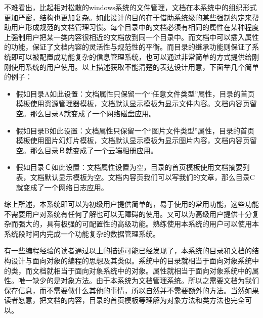 不难看出，比起相对松散的windows系统的文件管理，文档在本系统中的组织形式更加严密，结构也更加复杂。如此设计的目的在于借助系统级的某些强制约定来帮助用户形成规范的文档管理习惯。每个目录中的文档必须有相同的属性在某种程度上强制用户把某一类内容很相近的文档放到同一个目录中。而文档中可以插入属性的功能，保证了文档内容的灵活性与规范性的平衡。而目录的继承功能则保证了系统即可以被配置成功能复杂的信息管理系统，也可以通过非常简单的方式提供给刚刚使用系统的用户使用。以上描述获取不能清楚的表达设计用意，下面举几个简单的例子：
\begin{itemize}
\item 假如目录A如此设置：文档属性只保留一个“任意文件类型”属性，目录的首页模板使用资源管理器模板，文档默认显示模板为显示文件内容。文档内容页留空。那么目录A就变成了一个网络磁盘应用。
\item 假如目录B如此设置：文档属性只保留一个“图片文件类型”属性，目录的首页模板使用图片幻灯片模板，文档默认显示模板为显示图片内容，文档内容页留空。那么目录Ｂ就变成了一个云端相册应用。
\item 假如目录Ｃ如此设置：文档属性设置为空，目录的首页模板使用文档摘要列表，文档默认显示模板为空。文档内容页我们可以写我们的文章，那么目录C就变成了一个网络日志应用。
\end{itemize}
综上所述，本系统即可以为初级用户提供简单的，易于使用的常用功能，这些功能不需要用户对系统有任何了解也可以无障碍的使用。又可以为高级用户提供十分复杂而强大的，具有极强的可配置性的高级功能。熟练使用本系统的用户可以使用本系统段时间内完成一个功能复杂的数据管理系统。

有一些编程经验的读者通过以上的描述可能已经发现了，本系统的目录和文档的结构设计与面向对象的编程的思想及其类似。系统中的目录就相当于面向对象系统中的类，而文档就相当于面向对象系统中的对象。属性就相当于面向对象系统中的属性。唯一缺少的是对象方法。由于本系统为文档管理系统。所以之需要文档为我们保存信息，而不需要做什么其他的事情，所以自然并不需要额外的方法。当然如果读者愿意，把文档的内容，目录的首页模板等理解为对象方法和类方法也完全可以。

